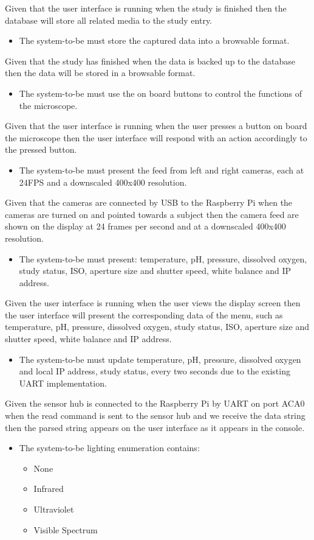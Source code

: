 Given that the user interface is running when the study is finished then the database will store all related media to the study entry.
\begin{itemize}
	\item The system-to-be must store the captured data into a browsable format.
\end{itemize}
Given that the study has finished when the data is backed up to the database then the data will be stored in a browsable format.
\begin{itemize}
	\item The system-to-be must use the on board buttons to control the functions of the microscope.
\end{itemize}
Given that the user interface is running when the user presses a button on board the microscope then the user interface will respond with an action accordingly to the pressed button.
\begin{itemize}
	\item The system-to-be must present the feed from left and right cameras, each at 24FPS and a downscaled 400x400 resolution.
\end{itemize}
Given that the cameras are connected by USB to the Raspberry Pi when the cameras are turned on and pointed towards a subject then the camera feed are shown on the display at 24 frames per second and at a downscaled 400x400 resolution.
\begin{itemize}
	\item The system-to-be must present: temperature, pH, pressure, dissolved oxygen, study status, ISO, aperture size and shutter speed, white balance and IP address.
\end{itemize}
Given the user interface is running when the user views the display screen then the user interface will present the corresponding data of the menu, such as temperature, pH, pressure, dissolved oxygen, study status, ISO, aperture size and shutter speed, white balance and IP address.
\begin{itemize}
	\item The system-to-be must update temperature, pH, pressure, dissolved oxygen and local IP address, study status, every two seconds due to the existing UART implementation.
\end{itemize}
Given the sensor hub is connected to the Raspberry Pi by UART on port ACA0 when the read command is sent to the sensor hub and we receive the data string then the parsed string appears on the user interface as it appears in the console.
\begin{itemize}
	\item The system-to-be lighting enumeration contains:
	      \begin{itemize}
		      \item None
		      \item Infrared
		      \item Ultraviolet
		      \item Visible Spectrum
	      \end{itemize}
\end{itemize}
